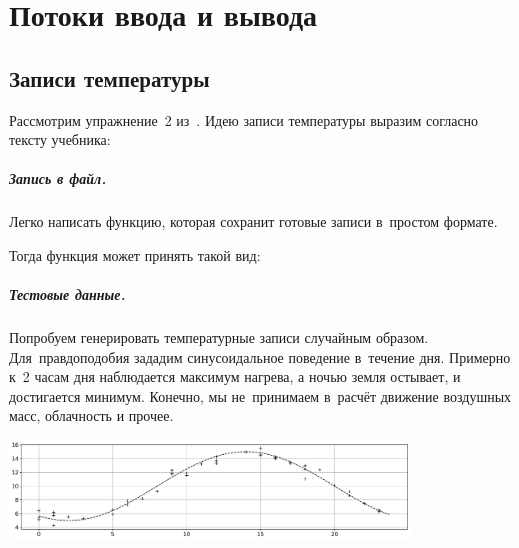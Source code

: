 
\chapter{Потоки ввода и вывода}

\section{Записи температуры}
Рассмотрим упражнение~2 из~. Идею записи температуры выразим согласно тексту  учебника:




\paragraph{Запись в файл.}
Легко написать функцию, которая сохранит готовые записи в~простом формате.


\noindent Тогда функция  может принять такой вид:




\paragraph{Тестовые данные.}
Попробуем генерировать температурные записи случайным образом. Для~правдоподобия зададим синусоидальное поведение в~течение дня. Примерно к~2 часам дня наблюдается максимум нагрева, а ночью земля остывает, и достигается минимум. Конечно, мы не~принимаем в~расчёт движение воздушных масс, облачность и прочее.

\begin{center}
  \includegraphics[width=0.8\textwidth]{images/raw_temps.pdf}
\end{center}

